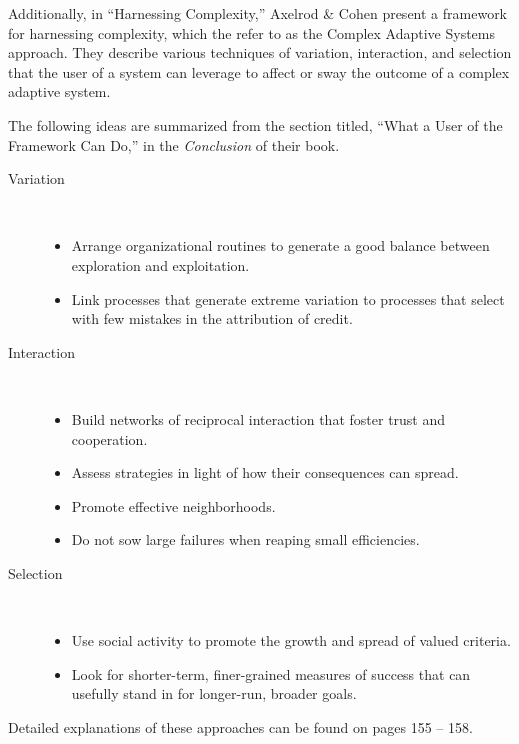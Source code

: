 \documentclass[letterpaper,10pt]{article}
\begin{document}
\begin{description}
Additionally, in ``Harnessing Complexity,'' Axelrod \& Cohen present a framework for harnessing complexity, which the refer to as the Complex Adaptive Systems approach.  They describe various techniques of variation, interaction, and selection that the user of a system can leverage to affect or sway the outcome of a complex adaptive system.

The following ideas are summarized from the section titled, ``What a User of the Framework Can Do,'' in the \emph{Conclusion} of their book.

\begin{description}
  \item[Variation] \ \\
    \begin{itemize}
      \item Arrange organizational routines to generate a good balance between exploration and exploitation.
      \item Link processes that generate extreme variation to processes that select with few mistakes in the attribution of credit.
    \end{itemize}
  \item[Interaction] \ \\
    \begin{itemize}
      \item Build networks of reciprocal interaction that foster trust and cooperation.
      \item Assess strategies in light of how their consequences can spread.
      \item Promote effective neighborhoods.
      \item Do not sow large failures when reaping small efficiencies.
    \end{itemize}
  \item[Selection] \ \\
    \begin{itemize}
      \item Use social activity to promote the growth and spread of valued criteria.
      \item Look for shorter-term, finer-grained measures of success that can usefully stand in for longer-run, broader goals.
    \end{itemize}
\end{description}

Detailed explanations of these approaches can be found on pages 155 -- 158.

\end{description}
\end{document}
